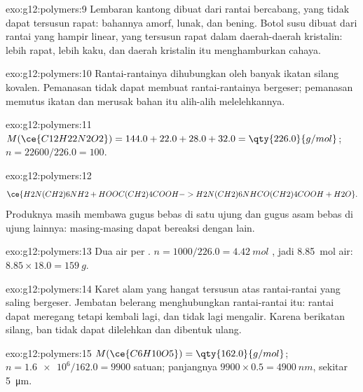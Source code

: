 \begin{solution}{exo:g12:polymers:9}
Lembaran kantong dibuat dari rantai bercabang, yang tidak dapat tersusun
rapat: bahannya amorf, lunak, dan bening. Botol susu dibuat dari rantai
yang hampir linear, yang tersusun rapat dalam daerah-daerah kristalin:
lebih rapat, lebih kaku, dan daerah kristalin itu menghamburkan cahaya.
\end{solution}

\begin{solution}{exo:g12:polymers:10}
Rantai-rantainya dihubungkan oleh banyak ikatan silang kovalen.
Pemanasan tidak dapat membuat rantai-rantainya bergeser; pemanasan
memutus ikatan dan merusak bahan itu alih-alih melelehkannya.
\end{solution}

\begin{solution}{exo:g12:polymers:11}
$M(\ce{C12H22N2O2}) = 144.0 + 22.0 + 28.0 + 32.0 = \qty{226.0}{g/mol}$;
$n = 22600/226.0 = 100$.
\end{solution}

\begin{solution}{exo:g12:polymers:12}
\[
  \ce{H2N(CH2)6NH2 + HOOC(CH2)4COOH -> H2N(CH2)6NHCO(CH2)4COOH + H2O} .
\]
Produknya masih membawa gugus  bebas di satu ujung dan gugus asam
bebas di ujung lainnya: masing-masing dapat bereaksi dengan 
lain.
\end{solution}

\begin{solution}{exo:g12:polymers:13}
Dua  air per . $n = 1000/226.0 =
\qty{4.42}{mol}$ , jadi \qty{8.85}{mol} air:
$8.85 \times 18.0 = \qty{159}{g}$.
\end{solution}

\begin{solution}{exo:g12:polymers:14}
Karet alam yang hangat tersusun atas rantai-rantai yang saling bergeser.
Jembatan belerang menghubungkan rantai-rantai itu: rantai dapat meregang
tetapi kembali lagi, dan tidak lagi mengalir. Karena berikatan silang,
ban tidak dapat dilelehkan dan dibentuk ulang.
\end{solution}

\begin{solution}{exo:g12:polymers:15}
$M(\ce{C6H10O5}) = \qty{162.0}{g/mol}$; $n = \num{1.6e6}/162.0 = 9900$
satuan; panjangnya $9900 \times 0.5 = \qty{4900}{nm}$, sekitar
\qty{5}{\micro m}.
\end{solution}

